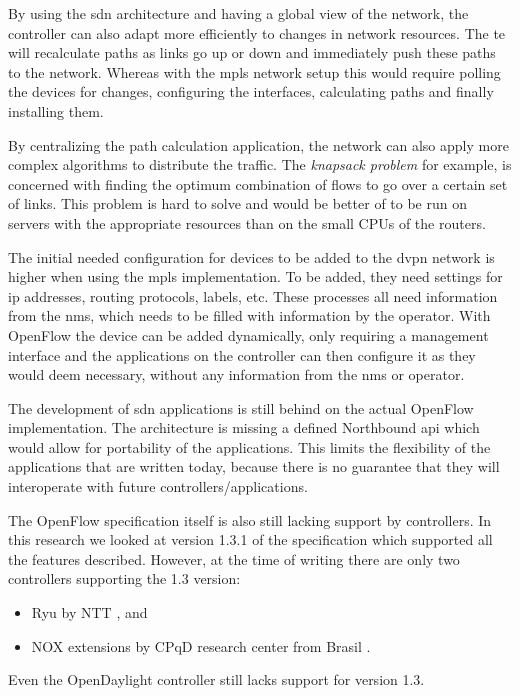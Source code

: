 By using the \ac{sdn} architecture and having a global view of the network, the controller can also adapt more efficiently to changes in network resources. The \ac{te} will recalculate paths as links go up or down and immediately push these paths to the network. Whereas with the \ac{mpls} network setup this would require polling the devices for changes, configuring the interfaces, calculating paths and finally installing them. 

By centralizing the path calculation application, the network can also apply more complex algorithms to distribute the traffic. The \textsl{knapsack problem} for example, is concerned with finding the optimum combination of flows to go over a certain set of links. This problem is hard to solve and would be better of to be run on servers with the appropriate resources than on the small CPUs of the routers. 

The initial needed configuration for devices to be added to the \ac{dvpn} network is higher when using the \ac{mpls} implementation. To be added, they need settings for \ac{ip} addresses, routing protocols, labels, etc. These processes all need information from the \ac{nms}, which needs to be filled with information by the operator. With OpenFlow the device can be added dynamically, only requiring a management interface and the applications on the controller can then configure it as they would deem necessary, without any information from the \ac{nms} or operator.

The development of \ac{sdn} applications is still behind on the actual OpenFlow implementation. The architecture is missing a defined Northbound \ac{api} which would allow for portability of the applications. This limits the flexibility of the applications that are written today, because there is no guarantee that they will interoperate with future controllers/applications.

The OpenFlow specification itself is also still lacking support by controllers. In this research we looked at version 1.3.1 of the specification which supported all the features described. However, at the time of writing there are only two controllers supporting the 1.3 version:
\begin{itemize}
	\item Ryu by NTT \cite{ryu}, and
	\item NOX extensions by CPqD research center from Brasil \cite{cpqd}.
\end{itemize}
Even the OpenDaylight controller still lacks support for version 1.3.





